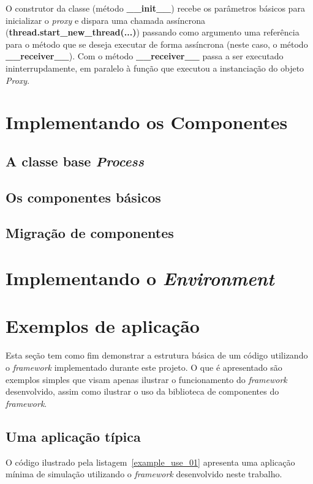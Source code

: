 O construtor da classe (método \textbf{\_\_init\_\_}) recebe os parâmetros básicos para inicializar o \textit{proxy} e dispara uma chamada assíncrona (\textbf{thread.start\_new\_thread(...)}) passando como argumento uma referência para o método que se deseja executar de forma assíncrona (neste caso, o método \textbf{\_\_receiver\_\_}). Com o método \textbf{\_\_receiver\_\_} passa a ser executado ininterrupdamente, em paralelo à função que executou a instanciação do objeto \textit{Proxy}.

\section{Implementando os Componentes \label{implement_components}}
\subsection{A classe base \emph{Process}}
\subsection{Os componentes básicos}
\subsection{Migração de componentes \label{migrar_componentes}}

\section{Implementando o \emph{Environment}}

\section{Exemplos de aplicação}

Esta seção tem como fim demonstrar a estrutura básica de um código utilizando o \textit{framework} implementado durante este projeto. O que é apresentado são exemplos simples que visam apenas ilustrar o funcionamento do \textit{framework} desenvolvido, assim como ilustrar o uso da biblioteca de componentes do \textit{framework}.

\subsection{Uma aplicação típica}

O código ilustrado pela listagem~\ref{example_use_01} apresenta uma aplicação mínima de simulação utilizando o \textit{framework} desenvolvido neste trabalho.

